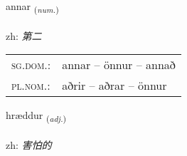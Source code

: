 \documentclass[frontgrid, backgrid]{flacards}\usepackage[]{graphicx}\usepackage[]{color}
\begin{document}
\renewcommand{\flhead}{\vskip5pt \fboxsep=0pt {\small\bfseries\footnotesize Töluorð | 数量词}}
\renewcommand{\fcfoot}{\vskip5pt \fboxsep=0pt \hspace{2pt}{\small\bfseries\footnotesize 2K}}

\renewcommand{\blhead}{\vskip5pt {\small\bfseries\footnotesize Töluorð | 数量词 }}
\renewcommand{\bcfoot}{\vskip5pt \hspace{2pt}{\small\bfseries\footnotesize 2K}}


{annar \small{\textsubscript{(\textit{num.})}} \\[1ex] %
\textphonetic{[anar]} \\
zh: \emph{第二} \\  [2ex]
\renewcommand*{\arraystretch}{0.8}
\begin{tabular}{ll}
\textsc{sg.dom.}: & annar  --  önnur -- annað \\ 
\textsc{pl.nom.}: & aðrir -- aðrar -- önnur
\end{tabular}
}

\renewcommand{\flhead}{\vskip5pt \fboxsep=0pt {\small\bfseries\footnotesize Lýsingarorð | 形容词}}
\renewcommand{\fcfoot}{\vskip5pt \fboxsep=0pt \hspace{2pt}{\small\bfseries\footnotesize 2K}}

\renewcommand{\blhead}{\vskip5pt {\small\bfseries\footnotesize Lýsingarorð | 形容词 }}
\renewcommand{\bcfoot}{\vskip5pt \hspace{2pt}{\small\bfseries\footnotesize 2K}}


{hræddur \small{\textsubscript{(\textit{adj.})}} \\[1ex] %
\textphonetic{[r̥aitʏr]} \\
zh: \emph{害怕的} \\  [2ex]
\renewcommand*{\arraystretch}{0.8}
}
\end{document}

